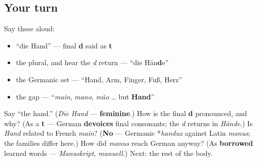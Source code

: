 \subsection*{Your turn}
Say these aloud:

\begin{itemize}
\raggedright
  \item \textquotedblleft{}die Hand\textquotedblright{} — final \textbf{d} said as \textbf{t}
  \item the plural, and hear the \emph{d} return — \textquotedblleft{}die Hän\textbf{d}e\textquotedblright{}
  \item the Germanic set — \textquotedblleft{}Hand, Arm, Finger, Fuß, Herz\textquotedblright{}
  \item the gap — \textquotedblleft{}\emph{main}, \emph{mano}, \emph{mão} … but \textbf{Hand}\textquotedblright{}
\end{itemize}

\begin{tcolorbox}[breakable,colback=teal!4,colframe=teal!35!black,title={Before you move on}]
Say \textquotedblleft{}the hand.\textquotedblright{} (\emph{Die Hand} — \textbf{feminine}.) How is the final \textbf{d} pronounced, and why? (As a \textbf{t} — German \textbf{devoices} final consonants; the \emph{d} returns in \emph{Hände}.) Is \emph{Hand} related to French \emph{main}? (\textbf{No} — Germanic *\emph{handuz} against Latin \emph{manus}; the families differ here.) How did \emph{manus} reach German anyway? (As \textbf{borrowed} learned words — \emph{Manuskript}, \emph{manuell}.) Next: the rest of the body.
\end{tcolorbox}
